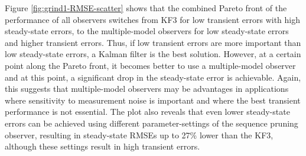 Figure \ref{fig:grind1-RMSE-scatter} shows that the combined Pareto front of the performance of all observers switches from KF3 for low transient errors with high steady-state errors, to the multiple-model observers for low steady-state errors and higher transient errors. Thus, if low transient errors are more important than low steady-state errors, a Kalman filter is the best solution. However, at a certain point along the Pareto front, it becomes better to use a multiple-model observer and at this point, a significant drop in the steady-state error is achievable. Again, this suggests that multiple-model observers may be advantages in applications where sensitivity to measurement noise is important and where the best transient performance is not essential. The plot also reveals that even lower steady-state errors can be achieved using different parameter-settings of the sequence pruning observer, resulting in steady-state RMSEs up to 27\% lower than the KF3, although these settings result in high transient errors.

